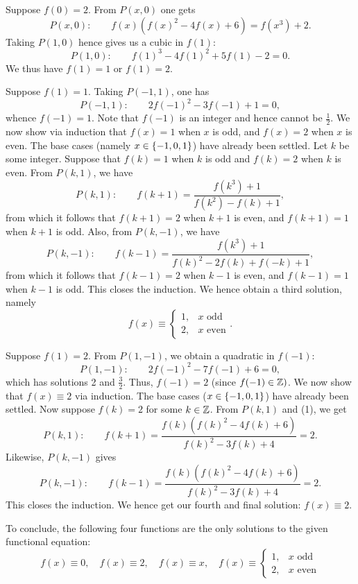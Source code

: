 \begin{solution*}
     Suppose $f(0) = 2$. From $P(x, 0)$ one gets \[P(x, 0) : \qquad f(x)(f(x)^2 - 4f(x) + 6) = f(x^3) + 2. \tag{1}\] Taking $P(1, 0)$ hence gives us a cubic in $f(1)$: \[P(1, 0) : \qquad f(1)^3 - 4f(1)^2 + 5f(1) - 2 = 0.\] We thus have $f(1) = 1$ or $f(1) = 2$.

     Suppose $f(1) = 1$. Taking $P(-1, 1)$, one has \[P(-1, 1): \qquad 2f(-1)^2 - 3f(-1) + 1 = 0,\] whence $f(-1) = 1$. Note that $f(-1)$ is an integer and hence cannot be $\frac12$. We now show via induction that $f(x) = 1$ when $x$ is odd, and $f(x) = 2$ when $x$ is even. The base cases (namely $x \in \left\lbrace -1, 0, 1 \right\rbrace$) have already been settled. Let $k$ be some integer. Suppose that $f(k) = 1$ when $k$ is odd and $f(k) = 2$ when $k$ is even. From $P(k, 1)$, we have
    \[P(k, 1) : \qquad f(k + 1) = \frac{f(k^3) + 1}{f(k^2) - f(k) + 1},\] from which it follows that $f(k + 1) = 2$ when $k + 1$ is even, and $f(k + 1) = 1$ when $k + 1$ is odd. Also, from $P(k, -1)$, we have \[P(k, -1) : \qquad f(k-1) = \frac{f(k^3) + 1}{f(k)^2 - 2f(k) + f(-k) + 1},\] from which it follows that $f(k - 1) = 2$ when $k - 1$ is even, and $f(k - 1) = 1$ when $k - 1$ is odd. This closes the induction. We hence obtain a third solution, namely \[f(x) \equiv \begin{cases}
        1, &\text{$x$ odd}\\
        2, &\text{$x$ even}
    \end{cases}.\]

     Suppose $f(1) = 2$. From $P(1, -1)$, we obtain a quadratic in $f(-1)$: \[P(1, -1) : \qquad 2f(-1)^2 - 7f(-1) + 6 = 0,\] which has solutions 2 and $\frac32$. Thus, $f(-1) = 2$ (since $f(-1) \in \mathbb{Z})$. We now show that $f(x) \equiv 2$ via induction. The base cases ($x \in \left\lbrace -1, 0, 1 \right\rbrace$) have already been settled. Now suppose $f(k) = 2$ for some $k \in \mathbb{Z}$. From $P(k, 1)$ and (1), we get \[P(k, 1) : \qquad f(k+1) = \frac{f(k)(f(k)^2 - 4f(k) + 6)}{f(k)^2 - 3f(k) + 4} = 2.\] Likewise, $P(k, -1)$ gives \[P(k, -1) : \qquad f(k-1) = \frac{f(k)(f(k)^2 - 4f(k) + 6)}{f(k)^2 - 3f(k) + 4} = 2.\] This closes the induction. We hence get our fourth and final solution: $f(x) \equiv 2$.

    To conclude, the following four functions are the only solutions to the given functional equation: \[f(x) \equiv 0, \quad f(x) \equiv 2, \quad f(x) \equiv x, \quad f(x) \equiv \begin{cases}
        1, &\text{$x$ odd}\\
        2, &\text{$x$ even}
    \end{cases}\]
\end{solution*}

